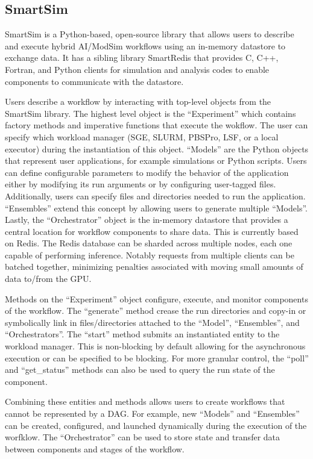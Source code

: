 \documentclass[utf8]{FrontiersinVancouver} %
\begin{document}
\subsection{SmartSim}
SmartSim is a Python-based, open-source library that allows users to describe
and execute hybrid AI/ModSim workflows using an in-memory datastore to exchange
data. It has a sibling library SmartRedis that provides C, C++, Fortran, and 
Python clients for simulation and analysis codes to enable components to
communicate with the datastore.

Users describe a workflow by interacting with top-level objects from the
SmartSim library. The highest level object is the ``Experiment'' which contains
factory methods and imperative functions that execute the wokflow. The user can
specify which workload manager (SGE, SLURM, PBSPro, LSF, or a local executor) during
the instantiation of this object. ``Models'' are the Python objects that
represent user applications, for example simulations or Python scripts. Users
can define configurable parameters to modify the behavior of the application
either by modifying its run arguments or by configuring user-tagged files.
Additionally, users can specify files and directories needed to run the
application. ``Ensembles'' extend this concept by allowing users to generate
multiple ``Models''. Lastly, the ``Orchestrator'' object is the in-memory
datastore that provides a central location for workflow components to share
data. This is currently based on Redis. The Redis database can be sharded across
multiple nodes, each one capable of performing inference. Notably requests from
multiple clients can be batched together, minimizing penalties associated with
moving small amounts of data to/from the GPU.

Methods on the ``Experiment'' object configure, execute, and monitor components
of the workflow. The ``generate'' method crease the run directories and copy-in
or symbolically link in files/directories attached to the ``Model'',
``Ensembles'', and ``Orchestrators''. The ``start'' method submits an
instantiated entity to the workload manager. This is non-blocking by default
allowing for the asynchronous execution or can be specified to be blocking.
For more granular control, the ``poll'' and ``get\_status'' methods can also
be used to query the run state of the component.

Combining these entities and methods allows users to create workflows that
cannot be represented by a DAG. For example, new ``Models'' and ``Ensembles''
can be created, configured, and launched dynamically during the execution of the
worfklow. The ``Orchestrator'' can be used to store state and transfer data
between components and stages of the workflow.
\end{document}
